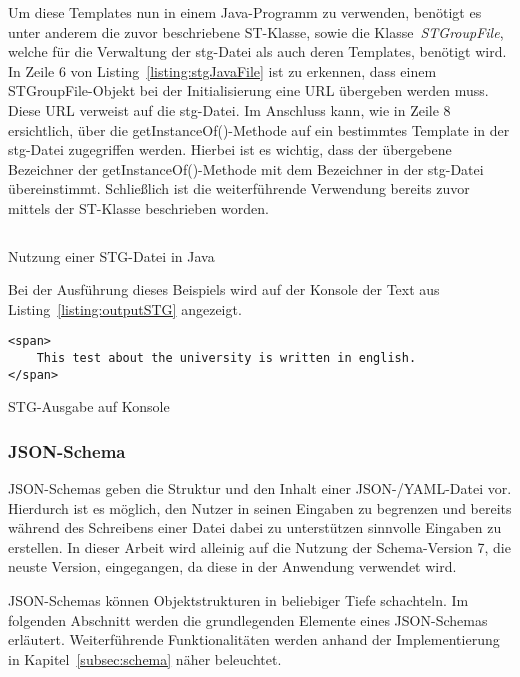 Um diese Templates nun in einem Java-Programm zu verwenden, benötigt es unter anderem die zuvor beschriebene ST-Klasse, sowie
die Klasse~\textit{STGroupFile}, welche für die Verwaltung der stg-Datei als auch deren Templates, benötigt wird.
In Zeile 6 von Listing~\ref{listing:stgJavaFile} ist zu erkennen, dass einem STGroupFile-Objekt bei der Initialisierung eine URL übergeben werden muss.
Diese URL verweist auf die stg-Datei.
Im Anschluss kann, wie in Zeile 8 ersichtlich, über die getInstanceOf()-Methode auf ein bestimmtes Template in der stg-Datei zugegriffen werden.
Hierbei ist es wichtig, dass der übergebene Bezeichner der getInstanceOf()-Methode mit dem Bezeichner in der stg-Datei übereinstimmt.
Schließlich ist die weiterführende Verwendung bereits zuvor mittels der ST-Klasse beschrieben worden.

\begin{listing}[!ht]
    \inputminted{java}{listings/2.2.1/JavaSTGExample.java}
    \caption{Nutzung einer STG-Datei in Java}
    \label{listing:stgJavaFile}
\end{listing}

Bei der Ausführung dieses Beispiels wird auf der Konsole der Text aus Listing~\ref{listing:outputSTG} angezeigt.

\begin{listing}[!ht]
    \begin{verbatim}
<span>
    This test about the university is written in english.
</span>
    \end{verbatim}
    \caption{STG-Ausgabe auf Konsole}
    \label{listing:outputSTG}
\end{listing}

\subsubsection{JSON-Schema}\label{subsubsec:json-schema}
JSON-Schemas geben die Struktur und den Inhalt einer JSON-/YAML-Datei vor.
Hierdurch ist es möglich, den Nutzer in seinen Eingaben zu begrenzen und bereits während des Schreibens einer Datei dabei zu unterstützen sinnvolle Eingaben zu erstellen.
In dieser Arbeit wird alleinig auf die Nutzung der Schema-Version 7, die neuste Version, eingegangen, da diese in der Anwendung verwendet wird.

JSON-Schemas können Objektstrukturen in beliebiger Tiefe schachteln.
Im folgenden Abschnitt werden die grundlegenden Elemente eines JSON-Schemas erläutert.
Weiterführende Funktionalitäten werden anhand der Implementierung in Kapitel~\ref{subsec:schema} näher beleuchtet.

